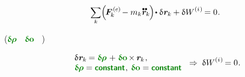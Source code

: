 \nopagebreak\vspace{-1em}
\begin{equation}\label{discrete:principleofvirtualwork.externalinternal}
\scalebox{.9}{$ \displaystyle \sum_{\smash{k}} $}
\Bigl( \hspace{-0.25ex} \bm{F}^{\smthexternal}_{\hspace{-0.16ex}k} \hspace{-0.1ex} - m_k \mathdotdotabove{\locationvector}_{\hspace{-0.1ex}k} \hspace{-0.2ex} \Bigr) \hspace{-0.32ex} \dotp \variation{\hspace{.1ex}\locationvector_{\hspace{-0.1ex}k}} \hspace{-0.1ex}
+ \variation{\internalwork} \hspace{-0.1ex} = 0
\hspace{.1ex} .
\vspace{-0.25em}\end{equation}

\vspace{-0.1em}
(${\constvarvector{\hspace{-0.1ex}\bm{\rho}}}$
~${\constvarvector{\bm{o}}}$\ru{\:---}
\ru{,}
~)

\nopagebreak\vspace{-0.2em}
\begin{equation}\label{assumptionforvirtualwork}
\begin{array}{l}
\variation{\hspace{.1ex}\locationvector_{\hspace{-0.1ex}k}} \hspace{-0.16ex}
= \constvarvector{\hspace{-0.1ex}\bm{\rho}} \hspace{.2ex} + \hspace{.12ex} \constvarvector{\bm{o}} \hspace{-0.2ex} \times \hspace{-0.1ex} \locationvector_{\hspace{-0.1ex}k}
\hspace{.1ex} ,
\\
\constvarvector{\hspace{-0.1ex}\bm{\rho}} = \boldconstant \hspace{.1ex} , \:
\constvarvector{\bm{o}} = \boldconstant
\end{array}
\hspace{.3ex} \Rightarrow \hspace{.6ex}
\variation{\internalwork} \hspace{-0.1ex} = 0 \hspace{.1ex}.
\end{equation}

